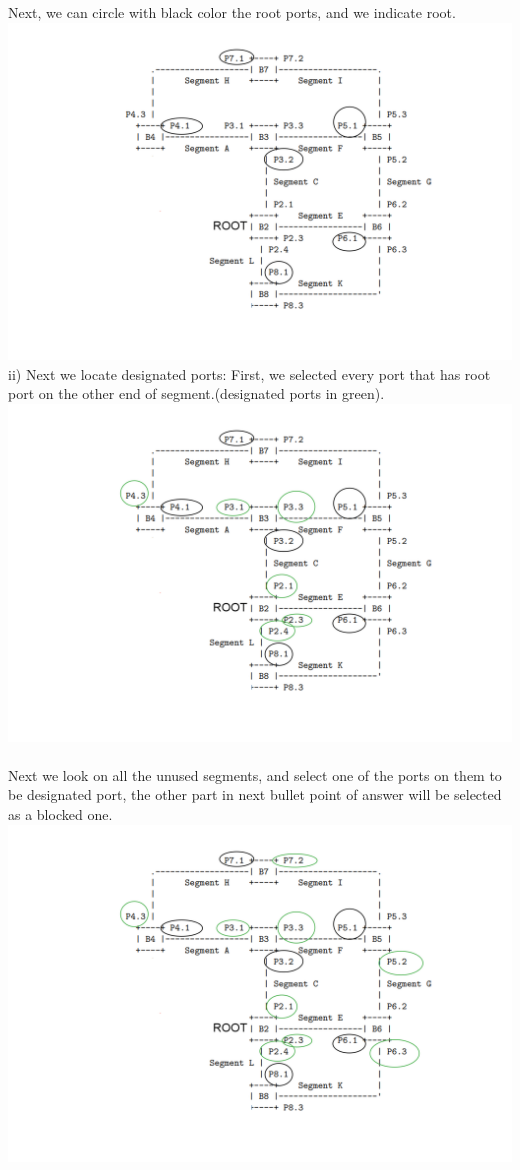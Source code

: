 \documentclass[a4paper]{article}
\begin{document}
Next, we can circle with black color the root ports, and we indicate root.\\
\includegraphics[scale=0.2]{aww-board4.png}\\
ii)
Next we locate designated ports:
First, we selected every port that has root port on the other end of segment.(designated ports in green).\\
\includegraphics[scale=0.2]{des-port2.png}\\
\\
Next we look on all the unused segments, and select one of the ports on them to be designated port, the other part in next bullet point of answer will be selected as a blocked one.\\
\includegraphics[scale=0.2]{aww-board5.png}
\end{document}
